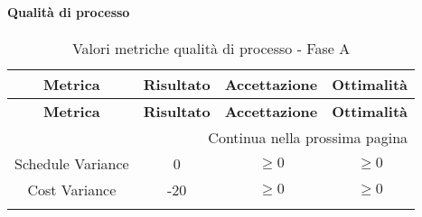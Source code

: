 \paragraph{Qualità di processo}
\begin{longtable}{|c|c|c|c|}
	\hline \multicolumn{1}{|c|}{\textbf{Metrica}} & \multicolumn{1}{c|}{\textbf{Risultato}} & \multicolumn{1}{c|}{\textbf{Accettazione}} & \multicolumn{1}{|c|}{\textbf{Ottimalità}} \\ 
	\hline 
	\endfirsthead
	
	\hline \multicolumn{1}{|c|}{\textbf{Metrica}} & \multicolumn{1}{c|}{\textbf{Risultato}} & \multicolumn{1}{c|}{\textbf{Accettazione}} & \multicolumn{1}{|c|}{\textbf{Ottimalità}} \\ 
	\hline 
	\endhead
	
	\hline \multicolumn{4}{|r|}{{Continua nella prossima pagina}} \\ 
	\hline
	\endfoot
	
	\hline
	\endlastfoot
	
	\hline Schedule Variance & 0 & $\geq 0$ & $\geq 0$ \\
	\hline Cost Variance & -20 & $\geq 0$ & $\geq 0$ \\
	\hline
	\caption{Valori metriche qualità di processo - Fase A}
\end{longtable}

